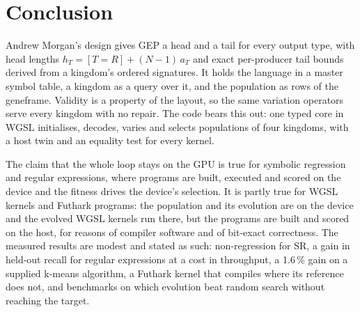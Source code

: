 \documentclass[11pt,a4paper]{report}
\begin{document}
\chapter{Conclusion}
\label{ch:conclusion}

Andrew Morgan's design gives GEP a head and a tail for every output type, with
head lengths $h_T=[T=R]+(N-1)\,a_T$ and exact per-producer tail bounds derived
from a kingdom's ordered signatures. It holds the language in a master symbol
table, a kingdom as a query over it, and the population as rows of the
geneframe. Validity is a property of the layout, so the same variation operators
serve every kingdom with no repair. The code bears this out: one typed core in
WGSL initialises, decodes, varies and selects populations of four kingdoms, with
a host twin and an equality test for every kernel.

The claim that the whole loop stays on the GPU is true for symbolic regression
and regular expressions, where programs are built, executed and scored on the
device and the fitness drives the device's selection. It is partly true for WGSL
kernels and Futhark programs: the population and its evolution are on the device
and the evolved WGSL kernels run there, but the programs are built and scored on
the host, for reasons of compiler software and of bit-exact correctness. The
measured results are modest and stated as such: non-regression for SR, a gain in
held-out recall for regular expressions at a cost in throughput, a 1.6\,\% gain
on a supplied k-means algorithm, a Futhark kernel that compiles where its
reference does not, and benchmarks on which evolution beat random search without
reaching the target.



\end{document}
